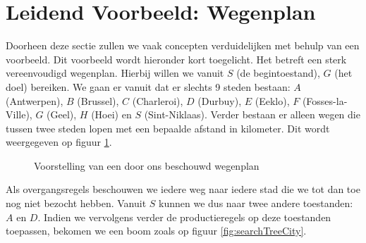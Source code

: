 \section{Leidend Voorbeeld: Wegenplan}
\begin{leftbar}
Doorheen deze sectie zullen we vaak concepten verduidelijken met behulp van een voorbeeld. Dit voorbeeld wordt hieronder kort toegelicht. Het betreft een sterk vereenvoudigd wegenplan. Hierbij willen we vanuit $S$ (de begintoestand), $G$ (het doel) bereiken. We gaan er vanuit dat er slechts 9 steden bestaan: $A$ (Antwerpen), $B$ (Brussel), $C$ (Charleroi), $D$ (Durbuy), $E$ (Eeklo), $F$ (Fosses-la-Ville), $G$ (Geel), $H$ (Hoei) en $S$ (Sint-Niklaas). Verder bestaan er alleen wegen die tussen twee steden lopen met een bepaalde afstand in kilometer. Dit wordt weergegeven op figuur \ref{fig:searchMapCity}.
\end{leftbar}
\begin{figure}[htb]
\centering
{}
\caption{Voorstelling van een door ons beschouwd wegenplan}
\label{fig:searchMapCity}
\end{figure}
\begin{leftbar}
Als overgangsregels beschouwen we iedere weg naar iedere stad die we tot dan toe nog niet bezocht hebben. Vanuit $S$ kunnen we dus naar twee andere toestanden: $A$ en $D$. Indien we vervolgens verder de productieregels op deze toestanden toepassen, bekomen we een boom zoals op figuur \ref{fig:searchTreeCity}.
\end{leftbar}
